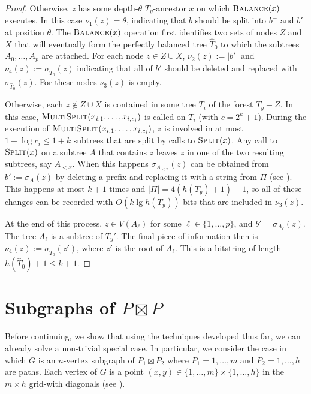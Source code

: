 \documentclass[kpfonts]{patmorin}
\let\le\leqslant
\begin{document}
\begin{proof}
  Otherwise, $z$ has some depth-$\theta$ $T_y$-ancestor $x$ on which $\textsc{Balance}(x)$ executes. In this case $\nu_{1}(z)=\theta$, indicating that $b$ should be split into $b^-$ and $b'$ at position $\theta$.  
  The $\textsc{Balance}(x)$ operation first identifies two sets of nodes $Z$ and $X$ that will eventually form the perfectly balanced tree $\hat{T}_0$ to which the subtrees $A_0,\ldots,A_p$ are attached.  For each node $z\in Z\cup X$, $\nu_{2}(z):=|b'|$ and $\nu_{4}(z):=\sigma_{\hat{T}_0}(z)$ indicating that all of $b'$ should be deleted and replaced with $\sigma_{\hat{T}_0}(z)$.  For these nodes $\nu_3(z)$ is empty.
    
  Otherwise, each $z\not\in Z\cup X$ is contained in some tree $T_i$ of the forest $T_y-Z$.  In this case, $\textsc{MultiSplit}(x_{i,1},\ldots,x_{i,c_i})$ is called on $T_i$ (with $c=2^k+1$).  During the execution of $\textsc{MultiSplit}(x_{i,1},\ldots,x_{i,c_i})$, $z$ is involved in at most $1+\log c_i\le 1+k$ subtrees that are split by calls to $\textsc{Split}(x)$.  Any call to $\textsc{Split}(x)$ on a subtree $A$ that contains $z$ leaves $z$ in one of the two resulting subtrees, say $A_{<x}$.  When this happens $\sigma_{A_{<x}}(z)$ can be obtained from $b':=\sigma_{A}(z)$ by deleting a prefix and replacing it with a string from $\Pi$ (see ).  This happens at most $k+1$ times and $|\Pi|= 4(h(T_y)+1)+1$, so all of these changes can be recorded with $O(k\lg h(T_y))$ bits that are included in $\nu_{3}(z)$.
  
  At the end of this process, $z\in V(A_\ell)$ for some $\ell\in\{1,\ldots,p\}$, and $b'=\sigma_{A_\ell}(z)$.  The tree $A_\ell$ is a subtree of $T_y'$.  The final piece of information then is $\nu_4(z):=\sigma_{\hat{T}_0}(z')$, where $z'$ is the root of $A_\ell$.  This is a bitstring of length $h(\hat{T}_0)+1\le k+1$.
\end{proof}

\section{Subgraphs of $P\boxtimes P$}

Before continuing, we show that using the techniques developed thus far, we can already solve a non-trivial special case.  In particular, we consider the case in which $G$ is an $n$-vertex subgraph of $P_1\boxtimes P_2$ where $P_1=1,\ldots,m$ and $P_2=1,\ldots,h$ are paths. Each vertex of $G$ is a point $(x,y)\in\{1,\ldots,m\}\times \{1,\ldots,h\}$ in the $m\times h$ grid-with diagonals (see ).
\end{document}

